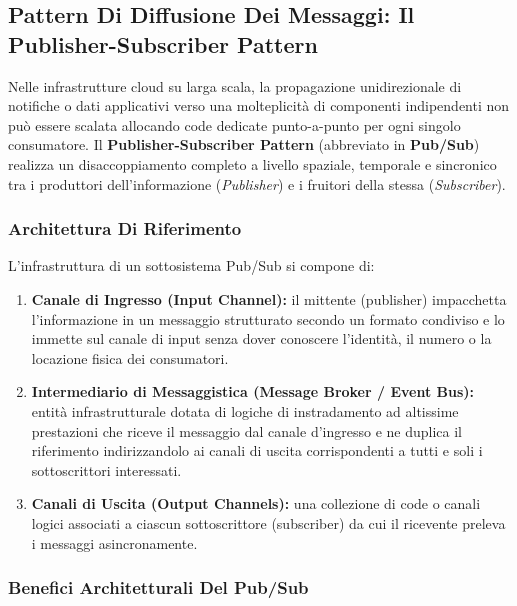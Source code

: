 \documentclass[11pt, a4paper]{article}
\begin{document}
\subsection{Pattern Di Diffusione Dei Messaggi: Il Publisher-Subscriber Pattern}

Nelle infrastrutture cloud su larga scala, la propagazione unidirezionale di notifiche o dati applicativi verso una molteplicità di componenti indipendenti non può essere scalata allocando code dedicate punto-a-punto per ogni singolo consumatore. Il \textbf{Publisher-Subscriber Pattern} (abbreviato in \textbf{Pub/Sub}) realizza un disaccoppiamento completo a livello spaziale, temporale e sincronico tra i produttori dell'informazione (\emph{Publisher}) e i fruitori della stessa (\emph{Subscriber}).

\subsubsection{Architettura Di Riferimento}


L'infrastruttura di un sottosistema Pub/Sub si compone di:
\begin{enumerate}
    \item \textbf{Canale di Ingresso (Input Channel):} il mittente (publisher) impacchetta l'informazione in un messaggio strutturato secondo un formato condiviso e lo immette sul canale di input senza dover conoscere l'identità, il numero o la locazione fisica dei consumatori.
    \item \textbf{Intermediario di Messaggistica (Message Broker / Event Bus):} entità infrastrutturale dotata di logiche di instradamento ad altissime prestazioni che riceve il messaggio dal canale d'ingresso e ne duplica il riferimento indirizzandolo ai canali di uscita corrispondenti a tutti e soli i sottoscrittori interessati.
    \item \textbf{Canali di Uscita (Output Channels):} una collezione di code o canali logici associati a ciascun sottoscrittore (subscriber) da cui il ricevente preleva i messaggi asincronamente.
\end{enumerate}

\subsubsection{Benefici Architetturali Del Pub/Sub}
\end{document}
